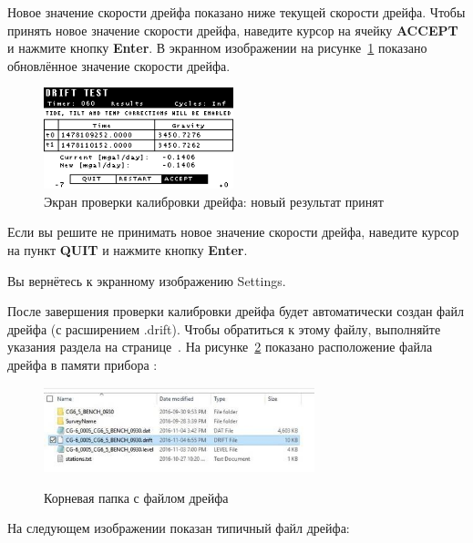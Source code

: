 Новое значение скорости дрейфа показано ниже текущей скорости дрейфа. Чтобы
принять новое значение скорости дрейфа, наведите курсор на ячейку
\textbf{ACCEPT} и нажмите кнопку \textbf{Enter}. В экранном изображении на
рисунке~\ref{fig:the_drift_calibration_test_screen_accepting_new_result}
показано обновлённое значение скорости дрейфа.

\begin{figure}[H]
  \centering
  \includegraphics[width=0.49\textwidth]{figures/the_drift_calibration_test_screen_accepting_new_result}
  \caption{Экран проверки калибровки дрейфа: новый результат принят}
  \label{fig:the_drift_calibration_test_screen_accepting_new_result}
\end{figure}

Если вы решите не принимать новое значение скорости дрейфа, наведите курсор на
пункт \textbf{QUIT} и нажмите кнопку \textbf{Enter}.

Вы вернётесь к экранному изображению Settings.

После завершения проверки калибровки дрейфа будет автоматически создан файл
дрейфа (с расширением .drift). Чтобы обратиться к этому файлу, выполняйте
указания раздела  на
странице~\pageref{subsec:taking_a_measurement}. На
рисунке~\ref{fig:the_drift_file_under_root_folder} показано расположение файла
дрейфа в памяти прибора \cg{}:

\begin{figure}[H]
  \centering
  \includegraphics[width=0.7\textwidth]{figures/the_drift_file_under_root_folder}
  \caption{}Корневая папка с файлом дрейфа
  \label{fig:the_drift_file_under_root_folder}
\end{figure}

На следующем изображении показан типичный файл дрейфа:


